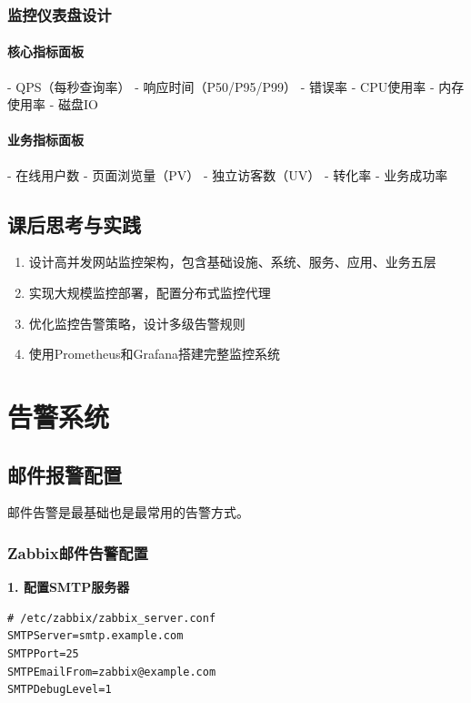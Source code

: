 \documentclass[12pt,UTF8]{ctexbook}
\begin{document}
\subsection*{监控仪表盘设计}

\subsubsection*{核心指标面板}
- QPS（每秒查询率）
- 响应时间（P50/P95/P99）
- 错误率
- CPU使用率
- 内存使用率
- 磁盘IO

\subsubsection*{业务指标面板}
- 在线用户数
- 页面浏览量（PV）
- 独立访客数（UV）
- 转化率
- 业务成功率

\section{课后思考与实践}
\label{sec:high-concurrency-monitor-practice}
\begin{enumerate}
    \item 设计高并发网站监控架构，包含基础设施、系统、服务、应用、业务五层
    \item 实现大规模监控部署，配置分布式监控代理
    \item 优化监控告警策略，设计多级告警规则
    \item 使用Prometheus和Grafana搭建完整监控系统
\end{enumerate}

\chapter{告警系统}
\label{chap:alerting}

\section{邮件报警配置}
\label{sec:email-alert}

邮件告警是最基础也是最常用的告警方式。

\subsection*{Zabbix邮件告警配置}

\textbf{1. 配置SMTP服务器}
\begin{lstlisting}
# /etc/zabbix/zabbix_server.conf
SMTPServer=smtp.example.com
SMTPPort=25
SMTPEmailFrom=zabbix@example.com
SMTPDebugLevel=1
\end{lstlisting}
\end{document}

